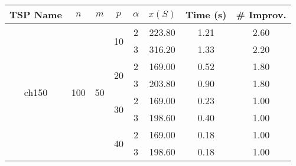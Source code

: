 \begin{tabular}{|ccccc|ccc|}
\toprule
      TSP Name & $n$ & $m$ & $p$ & $\alpha$   & $x(S)$ &  Time (s) &  \# Improv. \\
\midrule
\multirow{8}{*}{ch150} & \multirow{8}{*}{100} & \multirow{8}{*}{50} & \multirow{2}{*}{10} & 2 & 223.80 &  1.21 &     2.60 \\
      &     &    &    & 3 & 316.20 &  1.33 &     2.20 \\
\cline{4-8}
      &     &    & \multirow{2}{*}{20} & 2 & 169.00 &  0.52 &     1.80 \\
      &     &    &    & 3 & 203.80 &  0.90 &     1.80 \\
\cline{4-8}
      &     &    & \multirow{2}{*}{30} & 2 & 169.00 &  0.23 &     1.00 \\
      &     &    &    & 3 & 198.60 &  0.40 &     1.00 \\
\cline{4-8}
      &     &    & \multirow{2}{*}{40} & 2 & 169.00 &  0.18 &     1.00 \\
      &     &    &    & 3 & 198.60 &  0.18 &     1.00 \\
\bottomrule
\end{tabular}

